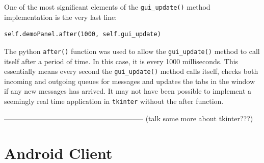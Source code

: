 \documentclass[finalReport.tex]{subfiles}
\begin{document}
One of the most significant elements of the \lstinline'gui_update()' method implementation is the very last line:
\begin{lstlisting}
self.demoPanel.after(1000, self.gui_update)
\end{lstlisting}

The python \lstinline'after()' function was used to allow the \lstinline'gui_update()' method to call itself after a period of time. In this case, it is every 1000 milliseconds. This essentially means every second the \lstinline'gui_update()' method calls itself, checks both incoming and outgoing queues for messages and updates the tabs in the window if any new messages has arrived. It may not have been possible to implement a seemingly real time application in \lstinline'tkinter' without the after function.

-----------------------------------------------------------
(talk some more about tkinter???)


\section{Android Client}\label{sec:impl:android}
\end{document}
